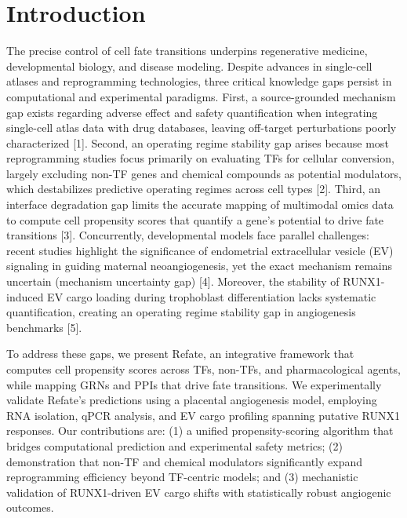 \documentclass[11pt,a4paper]{article}
\begin{document}
\section{Introduction}
The precise control of cell fate transitions underpins regenerative medicine, developmental biology, and disease modeling. Despite advances in single-cell atlases and reprogramming technologies, three critical knowledge gaps persist in computational and experimental paradigms. First, a source-grounded mechanism gap exists regarding adverse effect and safety quantification when integrating single-cell atlas data with drug databases, leaving off-target perturbations poorly characterized [1]. Second, an operating regime stability gap arises because most reprogramming studies focus primarily on evaluating TFs for cellular conversion, largely excluding non-TF genes and chemical compounds as potential modulators, which destabilizes predictive operating regimes across cell types [2]. Third, an interface degradation gap limits the accurate mapping of multimodal omics data to compute cell propensity scores that quantify a gene's potential to drive fate transitions [3]. Concurrently, developmental models face parallel challenges: recent studies highlight the significance of endometrial extracellular vesicle (EV) signaling in guiding maternal neoangiogenesis, yet the exact mechanism remains uncertain (mechanism uncertainty gap) [4]. Moreover, the stability of RUNX1-induced EV cargo loading during trophoblast differentiation lacks systematic quantification, creating an operating regime stability gap in angiogenesis benchmarks [5]. 

To address these gaps, we present Refate, an integrative framework that computes cell propensity scores across TFs, non-TFs, and pharmacological agents, while mapping GRNs and PPIs that drive fate transitions. We experimentally validate Refate's predictions using a placental angiogenesis model, employing RNA isolation, qPCR analysis, and EV cargo profiling spanning putative RUNX1 responses. Our contributions are: (1) a unified propensity-scoring algorithm that bridges computational prediction and experimental safety metrics; (2) demonstration that non-TF and chemical modulators significantly expand reprogramming efficiency beyond TF-centric models; and (3) mechanistic validation of RUNX1-driven EV cargo shifts with statistically robust angiogenic outcomes.
\end{document}
